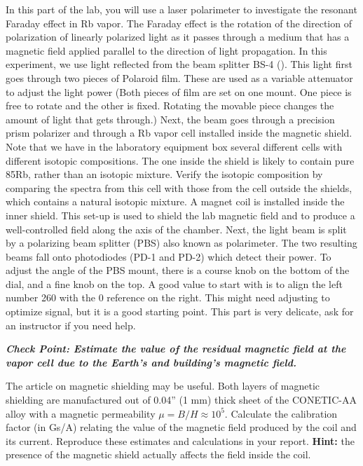 \documentclass{../lab}
\begin{document}
In this part of the lab, you will use a laser polarimeter to investigate the resonant Faraday effect in Rb vapor. The Faraday effect is the rotation of the direction of polarization of linearly polarized light as it passes through a medium that has a magnetic field applied parallel to the direction of light propagation. In this experiment, we use light reflected from the beam splitter BS-4 (). This light first goes through two pieces of Polaroid film. These are used as a variable attenuator to adjust the light power (Both pieces of film are set on one mount. One piece is free to rotate and the other is fixed. Rotating the movable piece changes the amount of light that gets through.) Next, the beam goes through a precision prism polarizer and through a Rb vapor cell installed inside the magnetic shield. Note that we have in the laboratory equipment box several different cells with different isotopic compositions. The one inside the shield is likely to contain pure 85Rb, rather than an isotopic mixture. Verify the isotopic composition by comparing the spectra from this cell with those from the cell outside the shields, which contains a natural isotopic mixture. A magnet coil is installed inside the inner shield. This set-up is used to shield the lab magnetic field and to produce a well-controlled field along the axis of the chamber. Next, the light beam is split by a polarizing beam splitter (PBS) also known as polarimeter. The two resulting beams fall onto photodiodes (PD-1 and PD-2) which detect their power. To adjust the angle of the PBS mount, there is a course knob on the bottom of the dial, and a fine knob on the top. A good value to start with is to align the left number 260 with the 0 reference on the right. This might need adjusting to optimize signal, but it is a good starting point. This part is very delicate, ask for an instructor if you need help.

\emph{\textbf{Check Point: Estimate the value of the residual magnetic field at the vapor cell due to the Earth's and building's magnetic field.}}

\newpage

The article on magnetic shielding may be useful. Both layers of magnetic shielding are manufactured out of 0.04'' (1 mm) thick sheet of the CONETIC-AA alloy with a magnetic permeability $\mu = B/H \approx 10^5$. Calculate the calibration factor (in Gs/A) relating the value of the magnetic field produced by the coil and its current. Reproduce these estimates and calculations in your report. \textbf{Hint:} the presence of the magnetic shield actually affects the field inside the coil.
\end{document}
